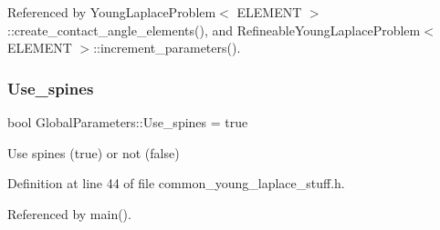 Referenced by Young\+Laplace\+Problem$<$ E\+L\+E\+M\+E\+N\+T $>$\+::create\+\_\+contact\+\_\+angle\+\_\+elements(), and Refineable\+Young\+Laplace\+Problem$<$ E\+L\+E\+M\+E\+N\+T $>$\+::increment\+\_\+parameters().

\mbox{\label{namespaceGlobalParameters_a7cd7766fae9d0ca421d7e24677be3131}} 
\subsubsection{\texorpdfstring{Use\+\_\+spines}{Use\_spines}}
{\footnotesize\ttfamily bool Global\+Parameters\+::\+Use\+\_\+spines = true}



Use spines (true) or not (false) 



Definition at line 44 of file common\+\_\+young\+\_\+laplace\+\_\+stuff.\+h.



Referenced by main().

